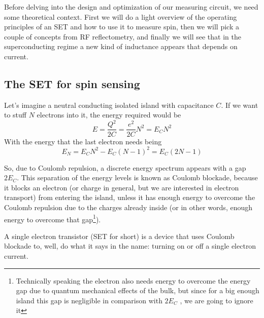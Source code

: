 \documentclass[../main.tex]{subfiles}
\begin{document}
Before delving into the design and optimization of our measuring circuit,
we need some theoretical context. First we will do a light overview of the
operating principles of an SET and how to use it to measure spin, then we will
pick a couple of concepts from RF reflectometry, and finally we will see that
in the superconducting regime a new kind of inductance appears that depends on
current.

\subsection{The SET for spin sensing}
\label{subsec:SET}
Let's imagine a neutral conducting isolated island with capacitance \(C\).
If we want to stuff \(N\) electrons into it, the energy required would be
\begin{equation*}
\label{eq:EnergyIsland}
    E = \frac{Q^2}{2C} = \frac{e^2}{2C}N^2 = E_{C}N^2
\end{equation*}
With the energy that the last electron needs being
\begin{equation*}
\label{eq:NthEnergyIsland}
    E_{N} = E_{C}N^2 - E_{C}(N-1)^2 = E_{C}(2N - 1)
\end{equation*}

So, due to Coulomb repulsion, a discrete energy spectrum appears with
a gap \(2E_{C}\). This separation of the energy levels is known as Coulomb
blockade, because it blocks an electron (or charge in general, but we are
interested in electron transport) from entering the island, unless it has
enough energy to overcome the Coulomb repulsion due to the charges already
inside (or in other words, enough energy to overcome that
gap\footnote{Technically speaking the electron also needs energy to overcome
the energy gap due to quantum mechanical effects of the bulk, but since for a
big enough island this gap is negligible in comparison with \(2E_{C}\)
\cite{nazarovQuantumTransportIntroduction2009}, we are going to ignore it}).

A single electron transistor (SET for short) is a device that uses Coulomb
blockade to, well, do what it says in the name: turning on or off a single
electron current.
\end{document}
